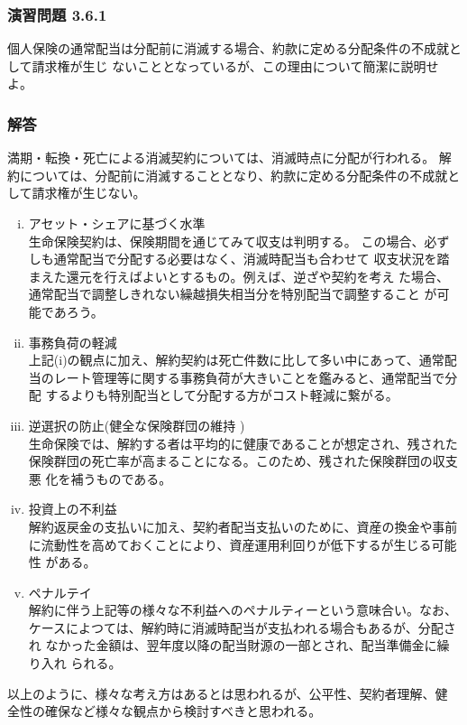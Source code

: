 \documentclass[report,gutter=10mm,fore-edge=10mm,uplatex,dvipdfmx]{jlreq}
\begin{document}
\subsubsection{演習問題 3.6.1}
個人保険の通常配当は分配前に消滅する場合、約款に定める分配条件の不成就として請求権が生じ
ないこととなっているが、この理由について簡潔に説明せよ。

\subsubsection{解答}

満期・転換・死亡による消滅契約については、消滅時点に分配が行われる。
解約については、分配前に消滅することとなり、約款に定める分配条件の不成就として請求権が生じない。

\begin{enumerate} [(i)]
 \item アセット・シェアに基づく水準\\
 生命保険契約は、保険期間を通じてみて収支は判明する。
 この場合、必ずしも通常配当で分配する必要はなく、消滅時配当も合わせて
 収支状況を踏まえた還元を行えばよいとするもの。例えば、逆ざや契約を考え
 た場合、通常配当で調整しきれない繰越損失相当分を特別配当で調整すること
 が可能であろう。
 \item  事務負荷の軽減\\
 上記(i)の観点に加え、解約契約は死亡件数に比して多い中にあって、通常配
 当のレート管理等に関する事務負荷が大きいことを鑑みると、通常配当で分配
 するよりも特別配当として分配する方がコスト軽減に繋がる。
 \item  逆選択の防止(健全な保険群団の維持 )\\
 生命保険では、解約する者は平均的に健康であることが想定され、残された
 保険群団の死亡率が高まることになる。このため、残された保険群団の収支悪
 化を補うものである。
 \item  投資上の不利益\\
 解約返戻金の支払いに加え、契約者配当支払いのために、資産の換金や事前
 に流動性を高めておくことにより、資産運用利回りが低下するが生じる可能性
 がある。
 \item  ペナルテイ\\
 解約に伴う上記等の様々な不利益へのペナルティーという意味合い。なお、
 ケースによつては、解約時に消滅時配当が支払われる場合もあるが、分配され
 なかった金額は、翌年度以降の配当財源の一部とされ、配当準備金に繰り入れ
 られる。
\end{enumerate}
以上のように、様々な考え方はあるとは思われるが、公平性、契約者理解、健
全性の確保など様々な観点から検討すべきと思われる。
\end{document}
